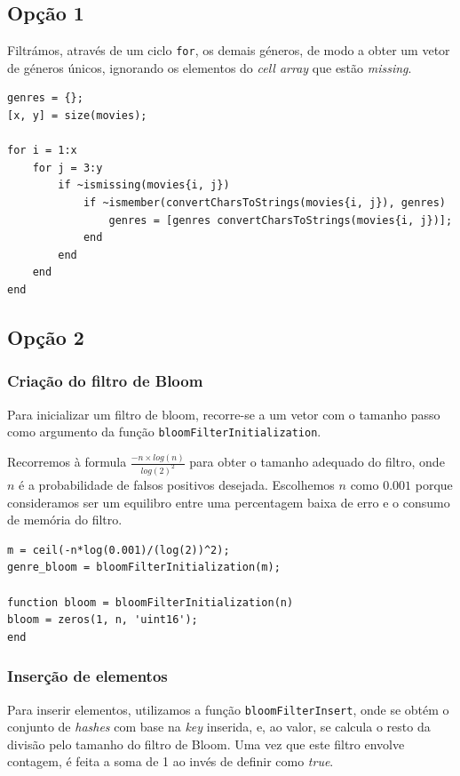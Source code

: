 \documentclass[portuguese, 11pt, a4paper,titlepage, oneside]{article}
\begin{document}
\subsection{Opção 1}
Filtrámos, através de um ciclo \verb|for|, os demais géneros, de modo a obter um vetor de géneros únicos, ignorando os elementos do \textit{cell array} que estão \textit{missing}.

\begin{lstlisting}[style=Matlab-editor]
genres = {};
[x, y] = size(movies);

for i = 1:x
    for j = 3:y
        if ~ismissing(movies{i, j})
            if ~ismember(convertCharsToStrings(movies{i, j}), genres)
                genres = [genres convertCharsToStrings(movies{i, j})];
            end
        end
    end
end
\end{lstlisting}

\subsection{Opção 2}
\subsubsection{Criação do filtro de Bloom}
Para inicializar um filtro de bloom, recorre-se a um vetor com o tamanho passo como argumento da função \verb|bloomFilterInitialization|.

Recorremos à formula \(\frac{-n\times log(n)}{log(2)^2}\) para obter o tamanho adequado do filtro, onde \(n\) é a probabilidade de falsos positivos desejada. Escolhemos \(n\) como \(0.001\) porque consideramos ser um equilibro entre uma percentagem baixa de erro e o consumo de memória do filtro.

\begin{lstlisting}[style=Matlab-editor]
m = ceil(-n*log(0.001)/(log(2))^2);
genre_bloom = bloomFilterInitialization(m);

function bloom = bloomFilterInitialization(n)
bloom = zeros(1, n, 'uint16');
end
\end{lstlisting}

\subsubsection{Inserção de elementos} \label{2_insert}
Para inserir elementos, utilizamos a função \verb|bloomFilterInsert|, onde se obtém o conjunto de \textit{hashes} com base na \textit{key} inserida, e, ao valor, se calcula o resto da divisão pelo tamanho do filtro de Bloom. Uma vez que este filtro envolve contagem, é feita a soma de 1 ao invés de definir como \textit{true}.
\end{document}
